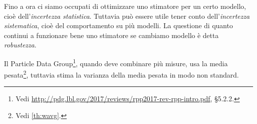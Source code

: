 

Fino a ora ci siamo occupati di ottimizzare uno stimatore per un certo modello,
cioè dell'\emph{incertezza statistica}.
Tuttavia può essere utile tener conto dell'\emph{incertezza sistematica},
cioè del comportamento su più modelli.
La questione di quanto continui a funzionare bene uno stimatore se cambiamo modello è detta \emph{robustezza}.

\begin{example}
	Il Particle Data Group\footnote{Vedi \url{http://pdg.lbl.gov/2017/reviews/rpp2017-rev-rpp-intro.pdf}, §5.2.2.}, quando deve combinare più misure, usa la media pesata\footnote{Vedi \autoref{th:wavg}.}, tuttavia stima la varianza della media pesata in modo non standard.
\end{example}

